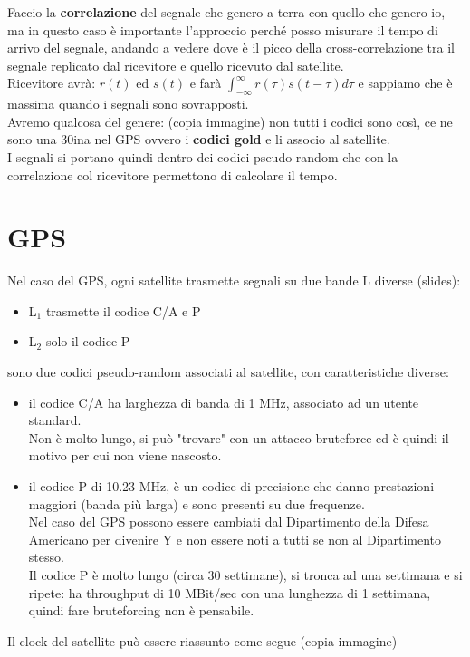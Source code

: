 \documentclass[oneside, 12pt]{extbook}
\begin{document}
Faccio la \textbf{correlazione} del segnale che genero a terra con quello che genero io, ma in questo caso è importante l'approccio perché posso misurare il tempo di arrivo del segnale, andando a vedere dove è il picco della cross-correlazione tra il segnale replicato dal ricevitore e quello ricevuto dal satellite.\\
Ricevitore avrà: $r(t)$ ed $s(t)$ e farà $\int_{-\infty}^{\infty} r(\tau) s(t-\tau) d\tau$ e sappiamo che è massima quando i segnali sono sovrapposti.\\
Avremo qualcosa del genere: (copia immagine)
non tutti i codici sono così, ce ne sono una 30ina nel GPS ovvero i \textbf{codici gold} e li associo al satellite.\\
I segnali si portano quindi dentro dei codici pseudo random che con la correlazione col ricevitore permettono di calcolare il tempo.


\section{GPS}
Nel caso del GPS, ogni satellite trasmette segnali su due bande L diverse (slides):
\begin{itemize}
	\item L$_1$ trasmette il codice C/A e P
	\item L$_2$ solo il codice P
\end{itemize}
sono due codici pseudo-random associati al satellite, con caratteristiche diverse:
\begin{itemize}
	\item il codice C/A ha larghezza di banda di 1 MHz, associato ad un utente standard.\\
	Non è molto lungo, si può "trovare" con un attacco bruteforce ed è quindi il motivo per cui non viene nascosto.
	\item il codice P di 10.23 MHz, è un codice di precisione che danno prestazioni maggiori (banda più larga) e sono presenti su due frequenze.\\
	Nel caso del GPS possono essere cambiati dal Dipartimento della Difesa Americano per divenire Y e non essere noti a tutti se non al Dipartimento stesso.\\
	Il codice P è molto lungo (circa 30 settimane), si tronca ad una settimana e si ripete: ha throughput di 10 MBit/sec con una lunghezza di 1 settimana, quindi fare bruteforcing non è pensabile.
\end{itemize}
Il clock del satellite può essere riassunto come segue (copia immagine)\\
\end{document}
